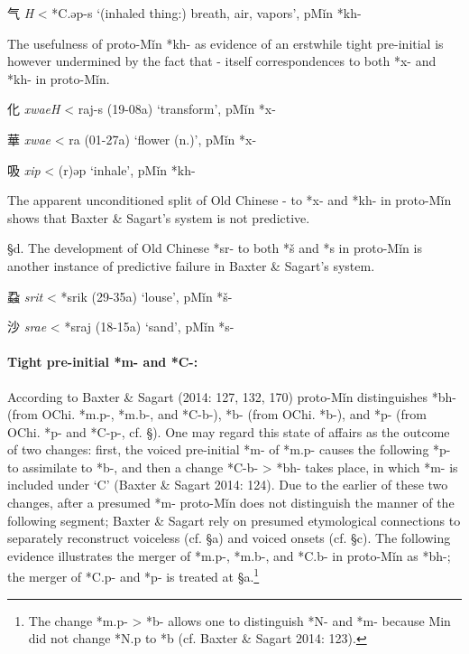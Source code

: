 \begin{description} \item
气  \emph{{}H} \textless{} *C.{}əp-s `(inhaled thing:) breath, air,
vapors', pMǐn *kh-
\end{description}

The usefulness of proto-Mǐn *kh- as evidence of an erstwhile tight
pre-initial is however undermined by the fact that {}- itself
correspondences to both *x- and *kh- in proto-Mǐn.

\begin{description} \item
化  \emph{xwaeH} \textless{} {}raj-s (19-08a) `transform', pMǐn *x-
\item
華  \emph{xwae} \textless{} {}ra (01-27a) `flower (n.)', pMǐn *x-
\item
吸  \emph{xip} \textless{} {}(r)əp `inhale', pMǐn *kh-
\end{description}

The apparent unconditioned split of Old Chinese {}- to *x- and *kh- in
proto-Mǐn shows that Baxter \& Sagart's system is not predictive.

§d. The development of Old Chinese *sr- to both *š and *s in proto-Mǐn
is another instance of predictive failure in Baxter \& Sagart's system.

\begin{description} \item
蝨  \emph{srit} \textless{} *srik (29-35a) `louse', pMǐn *š-
\item
沙  \emph{srae} \textless{} *s{}raj (18-15a) `sand', pMǐn *s-
\end{description}

\paragraph{Tight pre-initial *m- and *C-:}
According to Baxter \& Sagart (2014: 127, 132, 170) proto-Mǐn
distinguishes *bh- (from OChi. *m.p-, *m.b-, and *C-b-), *b- (from OChi.
*b-), and *p- (from OChi. *p- and *C-p-, cf. §). One may regard this
state of affairs as the outcome of two changes: first, the voiced
pre-initial *m- of *m.p- causes the following *p- to assimilate to *b-,
and then a change *C-b- \textgreater{} *bh- takes place, in which *m- is
included under `C' (Baxter \& Sagart 2014: 124). Due to the earlier of
these two changes, after a presumed *m- proto-Mǐn does not distinguish
the manner of the following segment; Baxter \& Sagart rely on presumed
etymological connections to separately reconstruct voiceless (cf. §a)
and voiced onsets (cf. §c). The following evidence illustrates the
merger of *m.p-, *m.b-, and *C.b- in proto-Mǐn as *bh-; the merger of
*C.p- and *p- is treated at §a.\footnote{The change *m.p- \textgreater{}
  *b- allows one to distinguish *N- and *m- because Min did not change
  *N.p to *b (cf. Baxter \& Sagart 2014: 123).}

